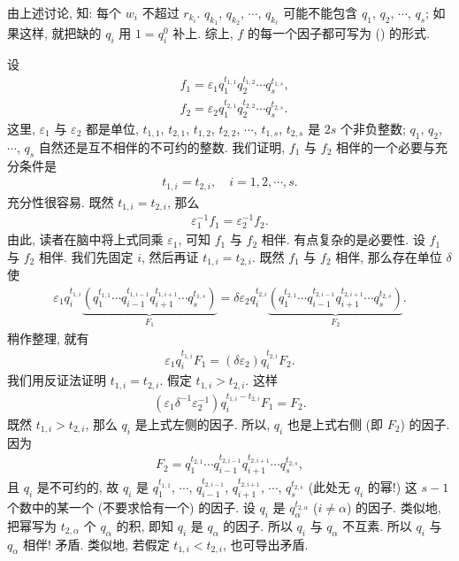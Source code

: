 \begin{pf}
    由上述讨论, 知: 每个 $w_i$ 不超过 $r_{k_i}$. $q_{k_1}$, $q_{k_2}$, $\cdots$, $q_{k_\ell}$ 可能不能包含 $q_1$, $q_2$, $\cdots$, $q_s$; 如果这样, 就把缺的 $q_i$ 用 $1 = q_i^0$ 补上. 综上, $f$ 的每一个因子都可写为 (\myStar) 的形式.

    设
    \begin{align*}
         & f_1 = \varepsilon_1 q_1^{t_{1,1}} q_2^{t_{1,2}} \cdots q_s^{t_{1,s}}, \\
         & f_2 = \varepsilon_2 q_1^{t_{2,1}} q_2^{t_{2,2}} \cdots q_s^{t_{2,s}}.
    \end{align*}
    这里, $\varepsilon_1$ 与 $\varepsilon_2$ 都是单位, $t_{1,1}$, $t_{2,1}$, $t_{1,2}$, $t_{2,2}$, $\cdots$, $t_{1,s}$, $t_{2,s}$ 是 $2s$ 个非负整数; $q_1$, $q_2$, $\cdots$, $q_s$ 自然还是互不相伴的不可约的整数. 我们证明, $f_1$ 与 $f_2$ 相伴的一个必要与充分条件是
    \begin{align*}
        t_{1,i} = t_{2,i}, \quad i = 1,2,\cdots,s.
    \end{align*}
    充分性很容易. 既然 $t_{1,i} = t_{2,i}$, 那么
    \begin{align*}
        \varepsilon_1^{-1} f_1 = \varepsilon_2^{-1} f_2.
    \end{align*}
    由此, 读者在脑中将上式同乘 $\varepsilon_1$, 可知 $f_1$ 与 $f_2$ 相伴. 有点复杂的是必要性. 设 $f_1$ 与 $f_2$ 相伴. 我们先固定 $i$, 然后再证 $t_{1,i} = t_{2,i}$. 既然 $f_1$ 与 $f_2$ 相伴, 那么存在单位 $\delta$ 使
    \begin{align*}
        \varepsilon_1 q_i^{t_{1,i}} \underbrace{\left(q_1^{t_{1,1}} \cdots q_{i-1}^{t_{1,i-1}} q_{i+1}^{t_{1,i+1}} \cdots q_s^{t_{1,s}}\right)}_{F_1} = \delta \varepsilon_2 q_i^{t_{2,i}} \underbrace{\left(q_1^{t_{2,1}} \cdots q_{i-1}^{t_{2,i-1}} q_{i+1}^{t_{2,i+1}} \cdots q_s^{t_{2,s}}\right)}_{F_2}.
    \end{align*}
    稍作整理, 就有
    \begin{align*}
        \varepsilon_1 q_i^{t_{1,i}} F_1 = (\delta \varepsilon_2) q_i^{t_{2,i}} F_2.
    \end{align*}
    我们用反证法证明 $t_{1,i} = t_{2,i}$. 假定 $t_{1,i} > t_{2,i}$. 这样
    \begin{align*}
        (\varepsilon_1 \delta^{-1} \varepsilon_2^{-1}) q_i^{t_{1,i} - t_{2,i}} F_1 = F_2.
    \end{align*}
    既然 $t_{1,i} > t_{2,i}$, 那么 $q_i$ 是上式左侧的因子. 所以, $q_i$ 也是上式右侧 (即 $F_2$) 的因子. 因为
    \begin{align*}
        F_2 = q_1^{t_{2,1}} \cdots q_{i-1}^{t_{2,i-1}} q_{i+1}^{t_{2,i+1}} \cdots q_s^{t_{2,s}},
    \end{align*}
    且 $q_i$ 是不可约的, 故 $q_i$ 是 $q_1^{t_{1,1}}$, $\cdots$, $q_{i-1}^{t_{2,i-1}}$, $q_{i+1}^{t_{2,i+1}}$, $\cdots$, $q_s^{t_{2,s}}$ (此处无 $q_i$ 的幂!) 这 $s-1$ 个数中的某一个 (不要求恰有一个) 的因子. 设 $q_i$ 是 $q_\alpha^{t_{2,\alpha}}$ ($i \neq \alpha$) 的因子. 类似地, 把幂写为 $t_{2,\alpha}$ 个 $q_\alpha$ 的积, 即知 $q_i$ 是 $q_\alpha$ 的因子. 所以 $q_i$ 与 $q_\alpha$ 不互素. 所以 $q_i$ 与 $q_\alpha$ 相伴! 矛盾. 类似地, 若假定 $t_{1,i} < t_{2,i}$, 也可导出矛盾.


\end{pf}
